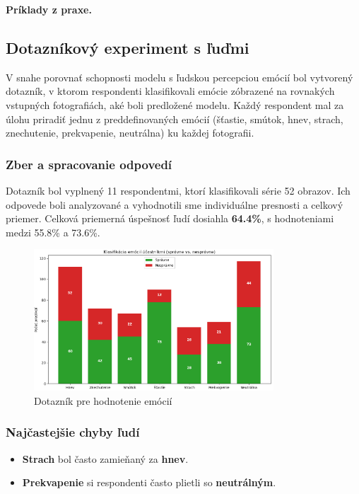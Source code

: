 \textbf{Príklady z praxe.}

\subsection{Dotazn\'ikov\'y experiment s \v{l}u\v{d}mi}

V snahe porovna\v{t} schopnosti modelu s \v{l}udskou percepciou em\'oci\'i bol vytvoren\'y dotazn\'ik, v ktorom respondenti klasifikovali em\'ocie z\'obrazen\'e na rovnak\'ych vstupn\'ych fotografi\'ach, ak\'e boli predlo\v{z}en\'e modelu. Ka\v{z}d\'y respondent mal za \'ulohu priradi\v{t} jednu z preddefinovan\'ych em\'oci\'i (\v{s}\v{t}astie, sm\'utok, hnev, strach, znechutenie, prekvapenie, neutr\'alna) ku ka\v{z}dej fotografii.

\subsubsection{Zber a spracovanie odpoved\'i}
Dotazn\'ik bol vyplnen\'y 11 respondentmi, ktor\'i klasifikovali s\'erie 52 obrazov. Ich odpovede boli analyzovan\'e a vyhodnotili sme individu\'alne presnosti a celkov\'y priemer. Celkov\'a priemern\'a \'uspe\v{s}nos\v{t} \v{l}ud\'i dosiahla \textbf{64.4\%}, s hodnoteniami medzi 55.8\% a 73.6\%.

\begin{figure}[!htpb]
\centering
    \includegraphics[width=0.8\textwidth]{img/experiments/google_form.png}
    \caption{Dotazn\'ik pre hodnotenie em\'oci\'i}
    \label{fig:google_form}
\end{figure}
\subsubsection{Naj\v{c}astej\v{s}ie chyby \v{l}ud\'i}
\begin{itemize}
    \item \textbf{Strach} bol \v{c}asto zamie\v{n}an\'y za \textbf{hnev}.
    \item \textbf{Prekvapenie} si respondenti \v{c}asto plietli so \textbf{neutr\'aln\'ym}.
\end{itemize}

